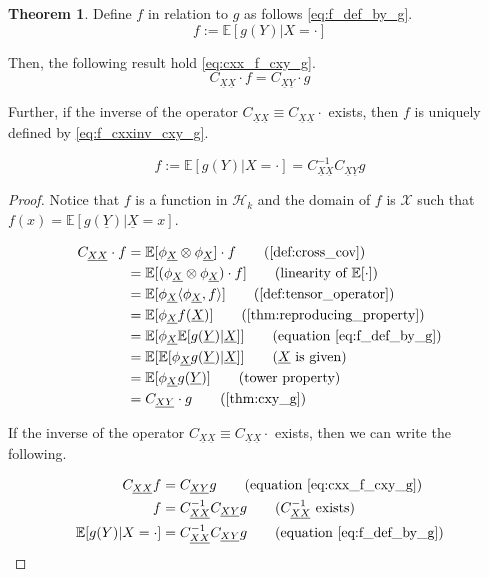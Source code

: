 \documentclass[twoside]{article} \usepackage{aistats2017}
\theoremstyle{definition}
\newtheorem{theorem}{Theorem}[section]
\newcommand{\rv}[1]{\underline{#1}}
\newcommand{\expect}[1]{{\mathbb{E}[#1]}}
\newcommand{\inner}[2]{{\langle #1, #2 \rangle}}
\newcommand{\phiX}{\phi_{\rv{X}}}
\newcommand{\Cxy}{C_{\rv{X} \rv{Y}}}
\newcommand{\Cxx}{C_{\rv{X} \rv{X}}}
\begin{document}
	\begin{theorem} \label{thm:cxx_f_cxy_g}
		Define $f$ in relation to $g$ as follows \eqref{eq:f_def_by_g}.
		\begin{equation}
			f := \expect{g(Y) | X = \cdot}
		\label{eq:f_def_by_g}
		\end{equation}
		
		Then, the following result hold \eqref{eq:cxx_f_cxy_g}.
		\begin{equation}
			\Cxx \cdot f = \Cxy \cdot g
		\label{eq:cxx_f_cxy_g}
		\end{equation}
		
		Further, if the inverse of the operator $\Cxx \equiv \Cxx \cdot$ exists, then $f$ is uniquely defined by \eqref{eq:f_cxxinv_cxy_g}.
		
		\begin{equation}
			f := \expect{g(Y) | X = \cdot} = \Cxx^{-1} \Cxy g
		\label{eq:f_cxxinv_cxy_g}
		\end{equation}

		\begin{proof}
		Notice that $f$ is a function in $\mathcal{H}_{k}$ and the domain of $f$ is $\mathcal{X}$ such that $f(x) = \expect{g(\rv{Y}) | \rv{X} = x}$.
		
		\begin{align*}
			\Cxx \cdot f &= \expect{\phiX \otimes \phiX} \cdot f \tag{\cref{def:cross_cov}} \\
			&= \expect{(\phiX \otimes \phiX) \cdot f} \tag{linearity of $\expect{\cdot}$} \\
			&= \expect{\phiX \inner{\phiX}{f}} \tag{\cref{def:tensor_operator}} \\
			&= \expect{\phiX f(\rv{X})} \tag{\cref{thm:reproducing_property}} \\
			&= \expect{\phiX \expect{g(\rv{Y}) | \rv{X}}} \tag{equation \eqref{eq:f_def_by_g}} \\
			&= \expect{\expect{\phiX g(\rv{Y}) | \rv{X}}} \tag{$\rv{X}$ is given} \\
			&= \expect{\phiX g(\rv{Y})} \tag{tower property} \\
			&= \Cxy \cdot g \tag{\cref{thm:cxy_g}}
		\end{align*}
		
		If the inverse of the operator $\Cxx \equiv \Cxx \cdot$ exists, then we can write the following.
		
		\begin{align*}
			\Cxx f &= \Cxy g \tag{equation \eqref{eq:cxx_f_cxy_g}} \\
			f &= \Cxx^{-1} \Cxy g \tag{$\Cxx^{-1}$ exists} \\
			\expect{g(Y) | X = \cdot} &= \Cxx^{-1} \Cxy g \tag{equation \eqref{eq:f_def_by_g}}
		\end{align*}
		
		\end{proof}
	\end{theorem}
	
\end{document}
